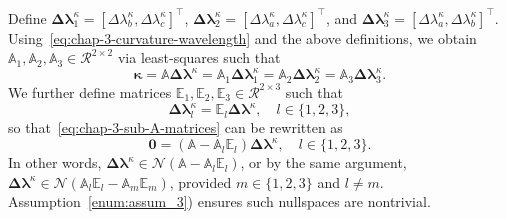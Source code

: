 Define $\mathbf{\Delta\boldsymbol \lambda}_1^{\kappa} = \left[ \Delta\lambda_b^{\kappa}, \Delta\lambda_c^{\kappa} \right]^{\top}$, $\mathbf{\Delta\boldsymbol \lambda}_2^{\kappa} = \left[ \Delta\lambda_a^{\kappa}, \Delta\lambda_c^{\kappa} \right]^{\top}$, and $\mathbf{\Delta\boldsymbol \lambda}_3^{\kappa} = \left[ \Delta\lambda_a^{\kappa}, \Delta\lambda_b^{\kappa} \right]^{\top}$. Using~\cref{eq:chap-3-curvature-wavelength} and the above definitions, we obtain $\mathbb{A}_{1}, \mathbb{A}_{2}, \mathbb{A}_{3}\in \mathcal{R}^{2\times2}$ via least-squares such that
\begin{equation}
  \label{eq:chap-3-sub-A-matrices}
  \boldsymbol \kappa = \mathbb{A} \mathbf{\Delta\boldsymbol\lambda}^{\kappa} = \mathbb{A}_1 \mathbf{\Delta\boldsymbol\lambda}_1^{\kappa} = \mathbb{A}_2 \mathbf{\Delta\boldsymbol\lambda}_2^{\kappa} = \mathbb{A}_3 \mathbf{\Delta\boldsymbol\lambda}_3^{\kappa}.
\end{equation}
We further define matrices $\mathbb{E}_1, \mathbb{E}_2, \mathbb{E}_3\in \mathcal{R}^{2\times3}$ such that
\begin{equation}
  \label{eq:chap-3-selection-matrix}
  \mathbf{\Delta\boldsymbol\lambda}^{\kappa}_l = \mathbb{E}_l\mathbf{\Delta\boldsymbol\lambda}^{\kappa}, \quad l\in \{1, 2, 3\},
\end{equation}
 so that~\cref{eq:chap-3-sub-A-matrices} can be rewritten as
 \begin{equation}
   \label{eq:chap-3-zero}
   \mathbf{0} = \left( \mathbb{A} - \mathbb{A}_l\mathbb{E}_l \right)\mathbf{\Delta\boldsymbol\lambda}^{\kappa}, \quad l\in \{1, 2, 3\}.
 \end{equation} 
In other words, $\mathbf{\Delta\boldsymbol\lambda}^{\kappa} \in \mathcal{N} \left( \mathbb{A} - \mathbb{A}_l\mathbb{E}_l \right)$, or by the same argument, $\mathbf{\Delta\boldsymbol\lambda}^{\kappa} \in \mathcal{N} \left( \mathbb{A}_l\mathbb{E}_l - \mathbb{A}_m\mathbb{E}_m \right)$, provided $m\in\{1, 2, 3\}$ and $l \neq m$. Assumption~\ref{enum:assum_3}) ensures such nullspaces are nontrivial.

